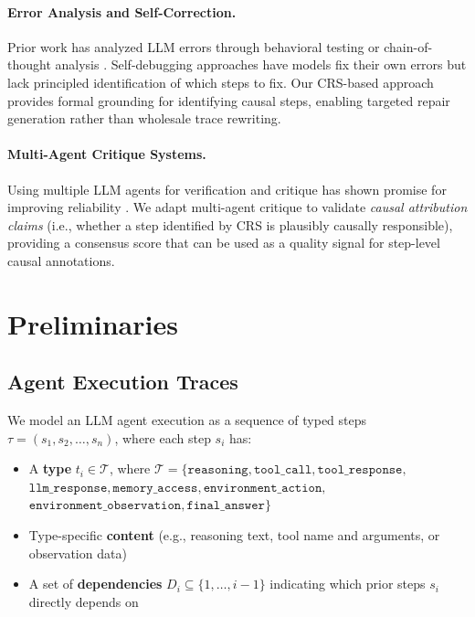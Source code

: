 \documentclass{article}
\theoremstyle{plain}
\theoremstyle{definition}
\theoremstyle{remark}
\begin{document}
\paragraph{Error Analysis and Self-Correction.}
Prior work has analyzed LLM errors through behavioral testing \cite{ribeiro2020beyond} or chain-of-thought analysis \cite{wei2022chain}. Self-debugging approaches \cite{chen2024teaching} have models fix their own errors but lack principled identification of which steps to fix. Our CRS-based approach provides formal grounding for identifying causal steps, enabling targeted repair generation rather than wholesale trace rewriting.

\paragraph{Multi-Agent Critique Systems.}
Using multiple LLM agents for verification and critique has shown promise for improving reliability \cite{du2023improving,liang2023encouraging}. We adapt multi-agent critique to validate \emph{causal attribution claims} (i.e., whether a step identified by CRS is plausibly causally responsible), providing a consensus score that can be used as a quality signal for step-level causal annotations.
\section{Preliminaries}

\subsection{Agent Execution Traces}

We model an LLM agent execution as a sequence of typed steps $\tau = (s_1, s_2, \ldots, s_n)$, where each step $s_i$ has:
\begin{itemize}
    \item A \textbf{type} $t_i \in \mathcal{T}$, where $\mathcal{T} = \{\texttt{reasoning}, \texttt{tool\_call}, \texttt{tool\_response},$ \\ $\texttt{llm\_response}, \texttt{memory\_access}, \texttt{environment\_action},$ \\ $\texttt{environment\_observation}, \texttt{final\_answer}\}$
    \item Type-specific \textbf{content} (e.g., reasoning text, tool name and arguments, or observation data)
    \item A set of \textbf{dependencies} $D_i \subseteq \{1, \ldots, i-1\}$ indicating which prior steps $s_i$ directly depends on
\end{itemize}
\end{document}
